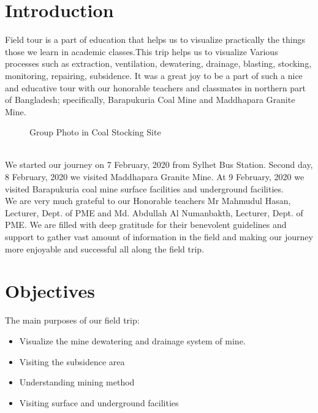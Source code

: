 \documentclass[12pt,a4paper]{article}
\begin{document}
	\begin{center}
	\tableofcontents
	\thispagestyle{empty}
	\end{center}
	\newpage
	\setcounter{page}{1}
	
	


\section{Introduction}
Field tour is a part of education that helps us to visualize practically the things those we learn in academic classes.This trip helps us to visualize Various processes such as extraction, ventilation, dewatering, drainage, blasting, stocking, monitoring, repairing, subsidence. It was a great joy to be a part of such a nice and educative tour with our honorable teachers and classmates in northern part of Bangladesh; specifically, Barapukuria Coal Mine and Maddhapara Granite Mine.

\begin{figure}[h]
\centering
{}
\caption{Group Photo in Coal Stocking Site}
\end{figure}
\noindent
\\We started our journey on 7 February, 2020 from Sylhet Bus Station. Second day, 8 February, 2020 we visited Maddhapara Granite Mine. At 9 February, 2020 we visited Barapukuria coal mine surface facilities and underground facilities.\\

\noindent
We are very much grateful to our Honorable teachers Mr Mahmudul Hasan, Lecturer, Dept. of PME and Md. Abdullah Al Numanbakth, Lecturer, Dept. of PME. We are filled with deep gratitude for their benevolent guidelines and support to gather vast amount of information in the field and making our journey more enjoyable and successful all along the field trip.
\section{Objectives}
The main purposes of our field trip:
\begin{itemize}
  \item Visualize the mine dewatering and drainage system of mine.
  \item Visiting the subsidence area
  \item Understanding mining method
  \item Visiting surface and underground facilities
\end{itemize}
\end{document}
